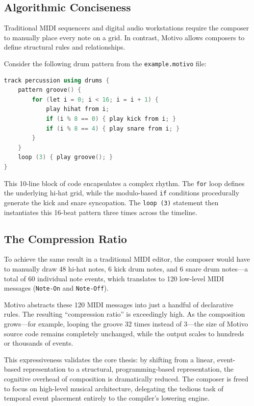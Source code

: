 \subsection{Algorithmic Conciseness}\label{detail-subsec:algorithmic-conciseness}

Traditional MIDI sequencers and digital audio workstations require the composer to manually place every note on a grid.
In contrast, Motivo allows composers to define structural rules and relationships.

Consider the following drum pattern from the \texttt{example.motivo} file:
\begin{lstlisting}[language=C++, caption={A generative drum pattern using control flow.},label={detail-lst:lstlisting4}]
track percussion using drums {
    pattern groove() {
        for (let i = 0; i < 16; i = i + 1) {
            play hihat from i;
            if (i % 8 == 0) { play kick from i; }
            if (i % 8 == 4) { play snare from i; }
        }
    }
    loop (3) { play groove(); }
}
\end{lstlisting}

This 10-line block of code encapsulates a complex rhythm.
The \texttt{for} loop defines the underlying hi-hat grid, while the modulo-based \texttt{if} conditions procedurally
generate the kick and snare syncopation.
The \texttt{loop (3)} statement then instantiates this 16-beat pattern three times across the timeline.

\subsection{The Compression Ratio}\label{detail-subsec:the-compression-ratio}

To achieve the same result in a traditional MIDI editor, the composer would have to manually draw 48 hi-hat notes, 6
kick drum notes, and 6 snare drum notes---a total of 60 individual note events, which translates to 120 low-level MIDI
messages (\texttt{Note-On} and \texttt{Note-Off}).

Motivo abstracts these 120 MIDI messages into just a handful of declarative rules.
The resulting ``compression ratio'' is exceedingly high.
As the composition grows---for example, looping the groove 32 times instead of 3---the size of Motivo source
code remains
completely unchanged, while the output scales to hundreds or thousands of events.

This expressiveness validates the core thesis: by shifting from a linear, event-based representation to a structural,
programming-based representation, the cognitive overhead of composition is dramatically reduced.
The composer is freed to focus on high-level musical architecture, delegating the tedious task of temporal event
placement entirely to the compiler's lowering engine.

